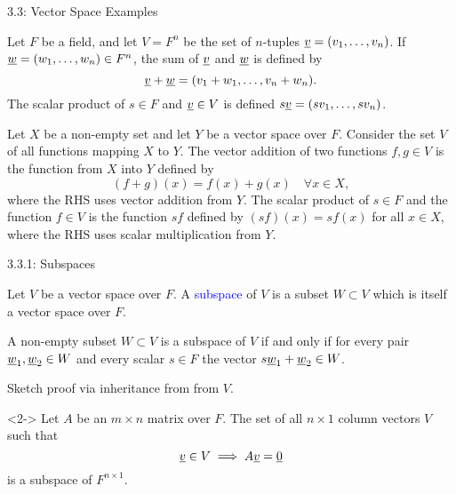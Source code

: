 \documentclass[10pt,letterpaper,english]{beamer}
\begin{document}
\begin{frame}{3.3: Vector Space Examples}

\begin{example}
Let $F$ be a field, and let $V=F^n$ be the set of $n$-tuples $\underline{v} = (v_1, \ldots, v_n)$.
If $\underline{w} = (w_1, \ldots, w_n) \in F^n$, the sum of $\underline{v}$ and $\underline{w}$ is defined by \vspace{-1mm}
\begin{equation*}
\underline{v} + \underline{w} = (v_1 + w_1, \ldots, v_n + w_n).
\end{equation*}
The scalar product of $s \in F$ and $\underline{v} \in V$ is defined $s \underline{v} = (s v_1, \ldots, s v_n)$.
\end{example}

\begin{example}
Let $X$ be a non-empty set and let $Y$ be a vector space over $F$.
Consider the set $V$ of all functions mapping $X$ to $Y$.
The vector addition of two functions $f,g \in V$ is the function from $X$ into $Y$ defined by  \vspace{-1mm}
\begin{equation*}
(f + g)(x) = f(x) + g(x) \quad \forall x \in X,
\end{equation*}
where the RHS uses vector addition from $Y$.
The scalar product of $s \in F$ and the function $f \in V$ is the function $sf$ defined by
$(sf)(x) = s f(x)$ for all $x \in X$,
where the RHS uses scalar multiplication from $Y$.
\vspace{-1mm}
\end{example}

\end{frame}



\begin{frame}{3.3.1: Subspaces}

\begin{definition}
Let $V$ be a vector space over $F$.
A \textcolor{blue}{subspace} of $V$ is a subset $W \subset V$ which is itself a vector space over $F$.
\end{definition}

\begin{lemma}
A non-empty subset $W \subset V$ is a subspace of $V$ if and only if for every pair $\underline{w}_1, \underline{w}_2 \in W$ and every scalar $s \in F$ the vector $s \underline{w}_1 + \underline{w}_2 \in W$.
\end{lemma}

Sketch proof via inheritance from from $V$.

\begin{example}<2->
Let $A$ be an $m \times n$ matrix over $F$.
The set of all $n \times 1$ column vectors $V$ such that
\begin{equation*}
\underline{v} \in V \implies A \underline{v} = \underline{0}
\end{equation*}
is a subspace of $F^{n \times 1}$.
\end{example}

\end{frame}
\end{document}
